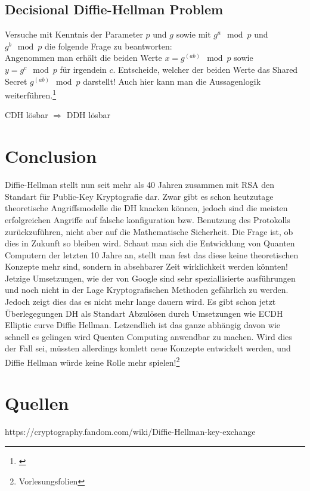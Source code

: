 \documentclass[a4paper,12pt]{scrartcl}
\begin{document}
\newpage
\subsection{Decisional Diffie-Hellman Problem}

Versuche mit Kenntnis der Parameter $p$ und $g$ sowie mit $g^a \mod p$  und $g^b \mod p$ die folgende Frage zu beantworten:\\
Angenommen man erhält die beiden Werte $x = g^(ab) \mod p$ sowie $y = g^c \mod p$ für irgendein $c$. Entscheide, welcher der beiden Werte das Shared Secret $g^(ab) \mod p$ darstellt!
Auch hier kann man die Aussagenlogik weiterführen.\footnote{\cite{10.1007/BFb0054851}}\\
\begin{center}
 CDH lösbar $\Rightarrow$ DDH lösbar
 
\end{center}


\section{Conclusion}
Diffie-Hellman stellt nun seit mehr als 40 Jahren zusammen mit RSA den Standart für Public-Key Kryptografie dar. Zwar gibt es schon heutzutage theoretische Angriffsmodelle die DH knacken können, jedoch sind die meisten erfolgreichen Angriffe auf falsche konfiguration bzw. Benutzung des Protokolls zurückzuführen, nicht aber auf die Mathematische Sicherheit. Die Frage ist, ob dies in Zukunft so bleiben wird. Schaut man sich die Entwicklung von Quanten Computern der letzten 10 Jahre an, stellt man fest das diese keine theoretischen Konzepte mehr sind, sondern in absehbarer Zeit wirklichkeit werden könnten! Jetzige Umsetzungen, wie der von Google sind sehr speziallisierte ausführungen und noch nicht in der Lage Kryptografischen Methoden gefährlich zu werden. Jedoch zeigt dies das es nicht mehr lange dauern wird. Es gibt schon jetzt Überlegegungen DH als Standart Abzulösen durch Umsetzungen wie ECDH 
Elliptic curve Diffie Hellman. Letzendlich ist das ganze abhängig davon wie schnell es gelingen wird Quenten Computing anwendbar zu machen. Wird dies der Fall sei, müssten allerdings komlett neue Konzepte entwickelt werden, und Diffie Hellman würde keine Rolle mehr spielen!\footnote{Vorlesungsfolien}
\newpage
\section{Quellen}
\printbibliography
https://cryptography.fandom.com/wiki/Diffie-Hellman-key-exchange
\end{document}

